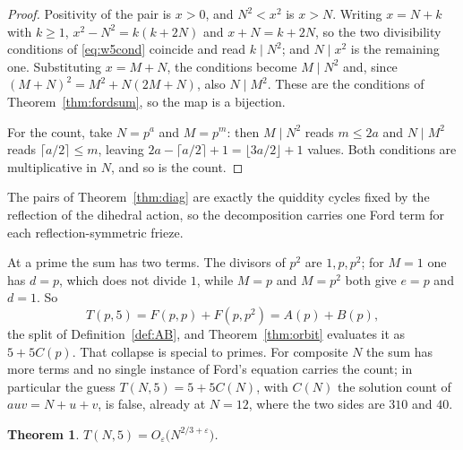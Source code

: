 \documentclass[11pt]{article}
\theoremstyle{plain}
\newtheorem{theorem}{Theorem}[section]
\theoremstyle{definition}
\begin{document}
\begin{proof}
Positivity of the pair is $x>0$, and $N^2<x^2$ is $x>N$. Writing $x=N+k$ with $k\ge1$,
$x^2-N^2=k(k+2N)$ and $x+N=k+2N$, so the two divisibility conditions of \eqref{eq:w5cond}
coincide and read $k\mid N^2$; and $N\mid x^2$ is the remaining one. Substituting $x=M+N$,
the conditions become $M\mid N^{2}$ and, since $(M+N)^2=M^2+N(2M+N)$, also $N\mid M^{2}$.
These are the conditions of Theorem~\ref{thm:fordsum}, so the map is a bijection.

For the count, take $N=p^{a}$ and $M=p^{m}$: then $M\mid N^2$ reads $m\le 2a$ and
$N\mid M^2$ reads $\lceil a/2\rceil\le m$, leaving
$2a-\lceil a/2\rceil+1=\lfloor 3a/2\rfloor+1$ values. Both conditions are multiplicative in
$N$, and so is the count.
\end{proof}

The pairs of Theorem~\ref{thm:diag} are exactly the quiddity cycles fixed by the reflection
of the dihedral action, so the decomposition carries one Ford term for each
reflection-symmetric frieze.

At a prime the sum has two terms. The divisors of $p^2$ are $1,p,p^2$; for $M=1$ one has
$d=p$, which does not divide $1$, while $M=p$ and $M=p^2$ both give $e=p$ and $d=1$. So
\[
  T(p,5)=F(p,p)+F(p,p^{2})=A(p)+B(p),
\]
the split of Definition~\ref{def:AB}, and Theorem~\ref{thm:orbit} evaluates it as
$5+5C(p)$. That collapse is special to primes. For composite $N$ the sum has more terms and
no single instance of Ford's equation carries the count; in particular the guess
$T(N,5)=5+5C(N)$, with $C(N)$ the solution count of $auv=N+u+v$, is false, already at
$N=12$, where the two sides are $310$ and $40$.

\begin{theorem}\label{thm:twothirds}
$T(N,5)=O_{\varepsilon}\bigl(N^{2/3+\varepsilon}\bigr)$.
\end{theorem}
\end{document}
